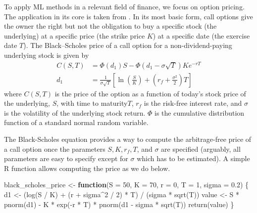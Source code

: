 \documentclass[
]{book}
\newenvironment{Shaded}{\begin{snugshade}}{\end{snugshade}}
\newcommand{\AttributeTok}[1]{\textcolor[rgb]{0.61,0.61,0.61}{#1}}
\newcommand{\ControlFlowTok}[1]{\textcolor[rgb]{0.27,0.27,0.27}{\textbf{#1}}}
\newcommand{\DecValTok}[1]{\textcolor[rgb]{0.06,0.06,0.06}{#1}}
\newcommand{\FloatTok}[1]{\textcolor[rgb]{0.06,0.06,0.06}{#1}}
\newcommand{\FunctionTok}[1]{\textcolor[rgb]{0,0,0}{#1}}
\newcommand{\NormalTok}[1]{#1}
\newcommand{\OtherTok}[1]{\textcolor[rgb]{0.37,0.37,0.37}{#1}}
\newcommand{\SpecialCharTok}[1]{\textcolor[rgb]{0,0,0}{#1}}
\begin{document}
To apply ML methods in a relevant field of finance, we focus on option pricing. The application in its core is taken from \citet{Hull2020}. In its most basic form, call options give the owner the right but not the obligation to buy a specific stock (the underlying) at a specific price (the strike price \(K\)) at a specific date (the exercise date \(T\)). The Black--Scholes price \citep{Black1976} of a call option for a non-dividend-paying underlying stock is given by
\[
\begin{aligned}
  C(S, T) &= \Phi(d_1)S - \Phi(d_1 - \sigma\sqrt{T})Ke^{-r T} \\
     d_1 &= \frac{1}{\sigma\sqrt{T}}\left[\ln\left(\frac{S}{K}\right) + \left(r_f + \frac{\sigma^2}{2}\right)T\right]
\end{aligned}
\]
where \(C(S, T)\) is the price of the option as a function of today's stock price of the underlying, \(S\), with time to maturity\(T\), \(r_f\) is the risk-free interest rate, and \(\sigma\) is the volatility of the underlying stock return. \(\Phi\) is the cumulative distribution function of a standard normal random variable.

The Black-Scholes equation provides a way to compute the arbitrage-free price of a call option once the parameters \(S, K, r_f, T\), and \(\sigma\) are specified (arguably, all parameters are easy to specify except for \(\sigma\) which has to be estimated). A simple R function allows computing the price as we do below.

\begin{Shaded}
\begin{Highlighting}[]
\NormalTok{black\_scholes\_price }\OtherTok{\textless{}{-}} \ControlFlowTok{function}\NormalTok{(}\AttributeTok{S =} \DecValTok{50}\NormalTok{, }\AttributeTok{K =} \DecValTok{70}\NormalTok{, }\AttributeTok{r =} \DecValTok{0}\NormalTok{, }\AttributeTok{T =} \DecValTok{1}\NormalTok{, }\AttributeTok{sigma =} \FloatTok{0.2}\NormalTok{) \{}
\NormalTok{  d1 }\OtherTok{\textless{}{-}}\NormalTok{ (}\FunctionTok{log}\NormalTok{(S }\SpecialCharTok{/}\NormalTok{ K) }\SpecialCharTok{+}\NormalTok{ (r }\SpecialCharTok{+}\NormalTok{ sigma}\SpecialCharTok{\^{}}\DecValTok{2} \SpecialCharTok{/} \DecValTok{2}\NormalTok{) }\SpecialCharTok{*}\NormalTok{ T) }\SpecialCharTok{/}\NormalTok{ (sigma }\SpecialCharTok{*} \FunctionTok{sqrt}\NormalTok{(T))}
\NormalTok{  value }\OtherTok{\textless{}{-}}\NormalTok{ S }\SpecialCharTok{*} \FunctionTok{pnorm}\NormalTok{(d1) }\SpecialCharTok{{-}}\NormalTok{ K }\SpecialCharTok{*} \FunctionTok{exp}\NormalTok{(}\SpecialCharTok{{-}}\NormalTok{r }\SpecialCharTok{*}\NormalTok{ T) }\SpecialCharTok{*} \FunctionTok{pnorm}\NormalTok{(d1 }\SpecialCharTok{{-}}\NormalTok{ sigma }\SpecialCharTok{*} \FunctionTok{sqrt}\NormalTok{(T))}
  \FunctionTok{return}\NormalTok{(value)}
\NormalTok{\}}
\end{Highlighting}
\end{Shaded}
\end{document}
